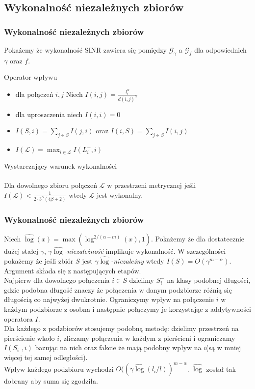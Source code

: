 \documentclass[polish, t,10pt]{beamer}
\begin{document}
\subsection{Wykonalność niezależnych zbiorów}
    \begin{frame}
        \frametitle{Wykonalność niezależnych zbiorów}
        Pokażemy że wykonalność SINR zawiera się pomiędzy $\mathcal{G}_{\gamma}$ a $\mathcal{G}_f$ dla odpowiednich $\gamma$ oraz $f$.
        \begin{block}{Operator wpływu}
            \begin{itemize}
                \item dla połączeń $i,j$ Niech $I(i,j) = \frac{l_i^{\alpha}}{d(i,j)^{\alpha}}$
                \item dla uproszczenia niech $I(i,i) = 0$
                \item $I(S,i) = \sum_{j \in S} I(j,i)$ oraz $I(i,S) = \sum_{j \in S} I(i,j)$
                \item $I(\mathcal{L}) = \max_{i \in \mathcal{L}} I(L_i^{-},i)$
            \end{itemize}
        \end{block}
        \begin{theorem}{Wystarczający warunek wykonalności \\~\\}
            Dla dowolnego zbioru połączeń $\mathcal{L}$ w przestrzeni metrycznej jeśli $I(\mathcal{L}) < \frac{1}{2\cdot3^{\alpha} (4\beta+2)}$ wtedy $\mathcal{L}$ jest wykonalny.
        \end{theorem}
    \end{frame}
    \begin{frame}
        \frametitle{Wykonalność niezależnych zbiorów}
        Niech $\widehat{\log}(x) = \max(\log^{2/(\alpha-m)}(x),1)$. Pokażemy że dla dostatecznie dużej stałej $\gamma$, \textit{$\gamma\widehat{\log}$-niezależność} implikuje wykonalność. W szczególności pokażemy że jeśli zbiór $S$ jest \textit{$\gamma\widehat{\log}$-niezależny} wtedy $I(S) = O(\gamma^{m-\alpha})$. \\
        Argument składa się z następujących etapów. \\
        Najpierw dla dowolnego połączenia $i \in S$ dzielimy $S_i^{-}$ na klasy podobnej długości, gdzie podobna długość znaczy że połączenia w danym podzbiorze różnią się długością co najwyżej dwukrotnie. Ograniczymy wpływ na połączenie $i$ w każdym podzbiorze z osobna i następnie połączymy je korzystając z addytywności operatora $I$. \\
        Dla każdego z podzbiorów stosujemy podobną metodę: dzielimy przestrzeń na pierścienie wkoło $i$, zliczamy połączenia w każdym z pierścieni i ograniczamy $I(S_i^{-},i)$ bazując na nich oraz fakcie że mają podobny wpływ na $i$(są w mniej więcej tej samej odległości). \\
        Wpływ każdego podzbioru wychodzi $O((\gamma\widehat{\log}(l_i/l))^{m-\alpha}$. $\widehat{\log}$ został tak dobrany aby suma się zgodziła.
    \end{frame}
\end{document}

